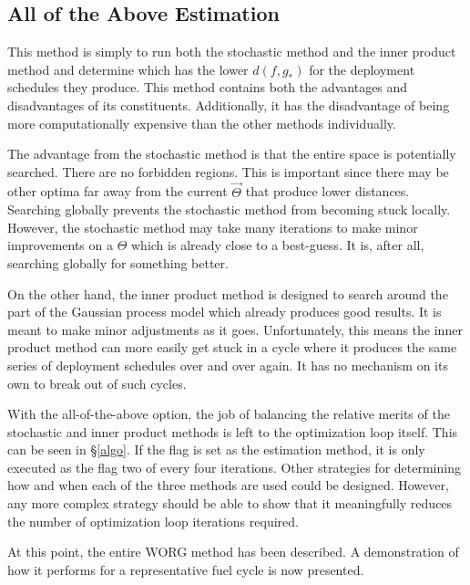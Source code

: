 \subsection{All of the Above Estimation}
\label{all}

This method is simply to run both the stochastic method and the inner product
method and determine which has the lower $d(f, g_*)$ for the deployment 
schedules they produce.  This method contains both the advantages and 
disadvantages of its constituents.  Additionally, it has the disadvantage 
of being more computationally expensive than the other methods individually.

The advantage from the stochastic method is that the entire space is 
potentially searched. There are no forbidden regions.
This is important since there may be other
optima far away from the current $\vec{\Theta}$ that produce lower distances.
Searching globally prevents the stochastic method from becoming stuck locally.
However, the stochastic method may take many iterations to 
make minor improvements on a $\Theta$ which is already close to a best-guess.
It is, after all, searching globally for something better.

On the other hand, the inner product method is designed to search around 
the part of the Gaussian process model which already produces good results. It
is meant to make minor adjustments as it goes.  Unfortunately, this means
the inner product method can more easily get stuck in a cycle  where it 
produces the same series of deployment schedules over and over again. 
It has no mechanism on its own to break out of such cycles.

With the all-of-the-above option, the job of balancing the relative merits
of the stochastic and inner product methods is left to the optimization 
loop itself.  This can be seen in \S\ref{algo}.  If the \allflag flag 
is set as the estimation method, it is only executed as the \allflag flag 
two of every four 
iterations.  Other strategies for determining how and when each of the 
three methods are used could be designed. However, any more complex strategy 
should be able to show that it meaningfully reduces the number of 
optimization loop iterations required.

At this point, the entire WORG method has been described. A
demonstration of how it performs for a representative fuel cycle is now
presented. 
